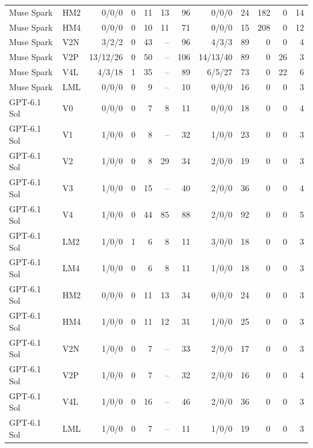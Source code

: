 \begin{tabular}{llrrrrrrrrrr}
Muse Spark & HM2 & 0/0/0 & 0 & 11 & 13 & 96 & 0/0/0 & 24 & 182 & 0 & 14 \\
Muse Spark & HM4 & 0/0/0 & 0 & 10 & 11 & 71 & 0/0/0 & 15 & 208 & 0 & 12 \\
Muse Spark & V2N & 3/2/2 & 0 & 43 & -- & 96 & 4/3/3 & 89 & 0 & 0 & 4 \\
Muse Spark & V2P & 13/12/26 & 0 & 50 & -- & 106 & 14/13/40 & 89 & 0 & 26 & 3 \\
Muse Spark & V4L & 4/3/18 & 1 & 35 & -- & 89 & 6/5/27 & 73 & 0 & 22 & 6 \\
Muse Spark & LML & 0/0/0 & 0 & 9 & -- & 10 & 0/0/0 & 16 & 0 & 0 & 3 \\
GPT-6.1 Sol & V0 & 0/0/0 & 0 & 7 & 8 & 11 & 0/0/0 & 18 & 0 & 0 & 4 \\
GPT-6.1 Sol & V1 & 1/0/0 & 0 & 8 & -- & 32 & 1/0/0 & 23 & 0 & 0 & 3 \\
GPT-6.1 Sol & V2 & 1/0/0 & 0 & 8 & 29 & 34 & 2/0/0 & 19 & 0 & 0 & 3 \\
GPT-6.1 Sol & V3 & 1/0/0 & 0 & 15 & -- & 40 & 2/0/0 & 36 & 0 & 0 & 4 \\
GPT-6.1 Sol & V4 & 1/0/0 & 0 & 44 & 85 & 88 & 2/0/0 & 92 & 0 & 0 & 5 \\
GPT-6.1 Sol & LM2 & 1/0/0 & 1 & 6 & 8 & 11 & 3/0/0 & 18 & 0 & 0 & 3 \\
GPT-6.1 Sol & LM4 & 1/0/0 & 0 & 6 & 8 & 11 & 1/0/0 & 18 & 0 & 0 & 3 \\
GPT-6.1 Sol & HM2 & 0/0/0 & 0 & 11 & 13 & 34 & 0/0/0 & 24 & 0 & 0 & 3 \\
GPT-6.1 Sol & HM4 & 1/0/0 & 0 & 11 & 12 & 31 & 1/0/0 & 25 & 0 & 0 & 3 \\
GPT-6.1 Sol & V2N & 1/0/0 & 0 & 7 & -- & 33 & 2/0/0 & 17 & 0 & 0 & 3 \\
GPT-6.1 Sol & V2P & 1/0/0 & 0 & 7 & -- & 32 & 2/0/0 & 16 & 0 & 0 & 4 \\
GPT-6.1 Sol & V4L & 1/0/0 & 0 & 16 & -- & 46 & 2/0/0 & 36 & 0 & 0 & 3 \\
GPT-6.1 Sol & LML & 1/0/0 & 0 & 7 & -- & 11 & 1/0/0 & 19 & 0 & 0 & 3 \\
\bottomrule
\end{tabular}
